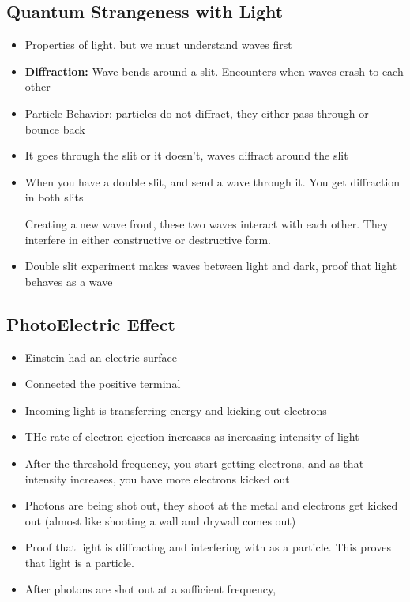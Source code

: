 \documentclass{article}
\begin{document}
\subsection{Quantum Strangeness with Light}

\begin{itemize}
  \item Properties of light, but we must understand waves first
  \item \textbf{Diffraction:} Wave bends around a slit. Encounters when waves crash to each other
  \item Particle Behavior: particles do not diffract, they either pass through or bounce back
  \item It goes through the slit or it doesn't, waves diffract around the slit
  \item When you have a double slit, and send a wave through it. You get diffraction in both slits

    Creating a new wave front, these two waves interact with each other. They interfere in either
    constructive or destructive form.
  \item Double slit experiment makes waves between light and dark, proof that light behaves as a wave
\end{itemize}

\subsection{PhotoElectric Effect}
\begin{itemize}
  \item Einstein had an electric surface
  \item Connected the positive terminal
  \item Incoming light is transferring energy and kicking out electrons
  \item THe rate of electron ejection increases as increasing intensity of light
  \item After the threshold frequency, you start getting electrons, and as that intensity
    increases, you have more electrons kicked out
  \item Photons are being shot out, they shoot at the metal and electrons get kicked out (almost like shooting a wall and drywall comes out)
  \item Proof that light is diffracting and interfering with as a particle.
    This proves that light is a particle.
  \item After photons are shot out at a sufficient frequency,
\end{itemize}
\end{document}

